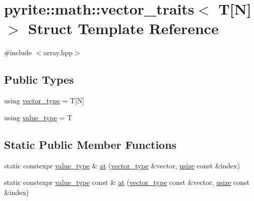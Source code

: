\hypertarget{structpyrite_1_1math_1_1vector__traits_3_01_t[_n]_4}{}\section{pyrite\+:\+:math\+:\+:vector\+\_\+traits$<$ T\mbox{[}N\mbox{]}$>$ Struct Template Reference}
\label{structpyrite_1_1math_1_1vector__traits_3_01_t[_n]_4}


{\ttfamily \#include $<$array.\+hpp$>$}

\subsection*{Public Types}
\begin{DoxyCompactItemize}
\item 
using \mbox{\hyperlink{structpyrite_1_1math_1_1vector__traits_3_01_t[_n]_4_a092357eae264b1a7aaf1a6e66e41fb52}{vector\+\_\+type}} = T\mbox{[}N\mbox{]}
\item 
using \mbox{\hyperlink{structpyrite_1_1math_1_1vector__traits_3_01_t[_n]_4_ab6b98499d39e4fb65ea3addf98fd7960}{value\+\_\+type}} = T
\end{DoxyCompactItemize}
\subsection*{Static Public Member Functions}
\begin{DoxyCompactItemize}
\item 
static constexpr \mbox{\hyperlink{structpyrite_1_1math_1_1vector__traits_3_01_t[_n]_4_ab6b98499d39e4fb65ea3addf98fd7960}{value\+\_\+type}} \& \mbox{\hyperlink{structpyrite_1_1math_1_1vector__traits_3_01_t[_n]_4_a348aa9a8c63771e16d5e7637839f5b18}{at}} (\mbox{\hyperlink{structpyrite_1_1math_1_1vector__traits_3_01_t[_n]_4_a092357eae264b1a7aaf1a6e66e41fb52}{vector\+\_\+type}} \&vector, \mbox{\hyperlink{type_8hpp_a3984e6dc0a53b867e054e8447f2f2be1}{usize}} const \&index)
\item 
static constexpr \mbox{\hyperlink{structpyrite_1_1math_1_1vector__traits_3_01_t[_n]_4_ab6b98499d39e4fb65ea3addf98fd7960}{value\+\_\+type}} const  \& \mbox{\hyperlink{structpyrite_1_1math_1_1vector__traits_3_01_t[_n]_4_ab20211c2d98e264b1edfdb3f72b128a1}{at}} (\mbox{\hyperlink{structpyrite_1_1math_1_1vector__traits_3_01_t[_n]_4_a092357eae264b1a7aaf1a6e66e41fb52}{vector\+\_\+type}} const \&vector, \mbox{\hyperlink{type_8hpp_a3984e6dc0a53b867e054e8447f2f2be1}{usize}} const \&index)
\end{DoxyCompactItemize}
